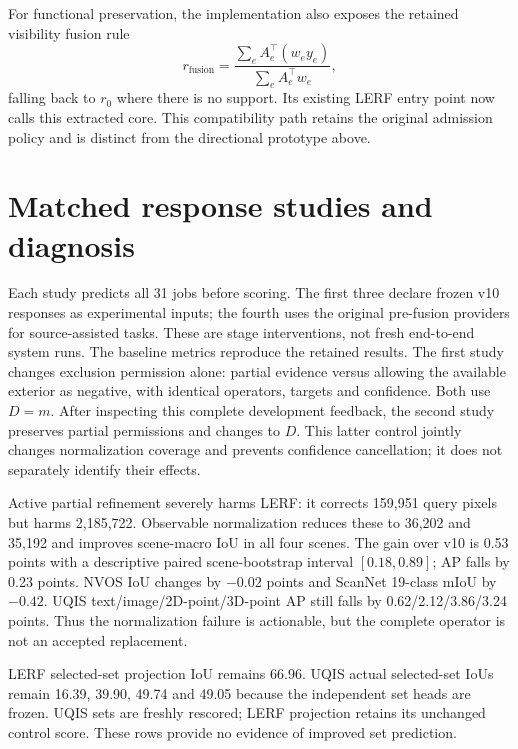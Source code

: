 \documentclass[10pt]{article}
\begin{document}
For functional preservation, the implementation also exposes the retained
visibility fusion rule
\[
 r_{\mathrm{fusion}} = \frac{\sum_e A_e^\top(w_e y_e)}{\sum_e A_e^\top w_e},
\]
falling back to $r_0$ where there is no support. Its existing LERF entry point now calls
this extracted core. This compatibility path retains the original admission
policy and is distinct from the directional prototype above.

\section{Matched response studies and diagnosis}
Each study predicts all 31 jobs before scoring. The first three declare frozen
v10 responses as experimental inputs; the fourth uses the original pre-fusion
providers for source-assisted tasks. These are stage interventions, not fresh
end-to-end system runs. The baseline metrics reproduce the retained results.
The first study changes exclusion permission alone: partial evidence versus
allowing the available exterior as negative, with identical operators, targets
and confidence. Both use $D=m$. After inspecting this complete development
feedback, the second study preserves partial permissions and changes to $D$.
This latter control jointly changes normalization coverage and prevents
confidence cancellation; it does not separately identify their effects.

\begin{table}[ht]
\centering\small
\resizebox{\linewidth}{!}{}
\caption{All-cohort response controls on opened development scenes. Active
partial and complement use active-mass normalization; observable uses the same
partial permissions with available-domain normalization. No per-task selection.}
\label{tab:response-controls}
\end{table}

Active partial refinement severely harms LERF: it corrects 159,951 query pixels
but harms 2,185,722. Observable normalization reduces these to 36,202 and 35,192
and improves scene-macro IoU in all four scenes. The gain over v10 is 0.53 points
with a descriptive paired scene-bootstrap interval $[0.18,0.89]$; AP falls by
0.23 points. NVOS IoU changes by $-0.02$ points and ScanNet 19-class mIoU by
$-0.42$. UQIS text/image/2D-point/3D-point AP still falls by
0.62/2.12/3.86/3.24 points. Thus the normalization failure is actionable, but
the complete operator is not an accepted replacement.

LERF selected-set projection IoU remains 66.96. UQIS actual selected-set IoUs
remain 16.39, 39.90, 49.74 and 49.05 because the independent set heads are frozen.
UQIS sets are freshly rescored; LERF projection retains its unchanged control
score. These rows provide no evidence of improved set prediction.
\end{document}
